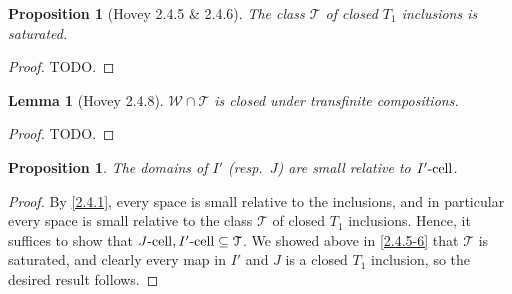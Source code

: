 \documentclass{amsart}
\theoremstyle{plain}
\newtheorem{proposition}[theorem]{Proposition}
\newtheorem{lemma}[theorem]{Lemma}
\theoremstyle{definition}
\newcommand{\sseq}{\subseteq}
\newcommand{\0}{\mathbf{0}}
\newcommand{\cT}{\mathcal T}
\newcommand{\cW}{\mathcal W}
\renewcommand{\(}{\left(}
\renewcommand{\)}{\right)}
\newcommand{\cell}{\text-\mathrm{cell}}
\begin{document}
\begin{proposition}[Hovey 2.4.5 \& 2.4.6]\label{2.4.5-6}
  The class $\cT$ of closed $T_1$ inclusions is saturated.
\end{proposition}
\begin{proof}
  \color{red}TODO.
\end{proof}

\begin{lemma}[Hovey 2.4.8]\label{2.4.8}
  $\cW\cap\cT$ is closed under transfinite compositions.
\end{lemma}
\begin{proof}
  \color{red}TODO.
\end{proof}

\begin{proposition}\label{domains_of_I'/J_small_rel_I'-cell/J-cell}
  The domains of $I'$ (resp.\ $J$) are small relative to $I'\cell$.
\end{proposition}
\begin{proof}
  By \autoref{2.4.1}, every space is small relative to the inclusions, and in particular every space is small relative to the class $\cT$ of closed $T_1$ inclusions. Hence, it suffices to show that $J\cell,I'\cell\sseq\cT$. We showed above in \autoref{2.4.5-6} that $\cT$ is saturated, and clearly every map in $I'$ and $J$ is a closed $T_1$ inclusion, so the desired result follows.
\end{proof}
\end{document}
